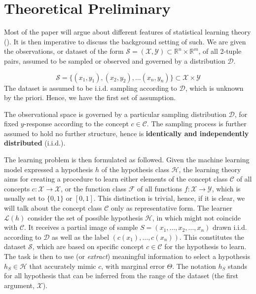 \documentclass{article}
\begin{document}
\section{Theoretical Preliminary}

Most of the paper will argue about different features of statistical learning theory (\cite{Sterkenburg_2024,Vapnik1999-VAPTNO,STL_Hajek_Maxim_2021}). It is then imperative to discuss the background setting of such. We are given the observations, or dataset of the form $\mathcal{S}=(\mathcal{X},\mathcal{Y})\subset \mathbb{R}^{n}\times \mathbb{R}^{m}$, of all 2-tuple pairs, assumed to be sampled or observed and governed by a distribution $\mathcal{D}$. 

\begin{equation*}
    \mathcal{S} = \{ (x_1,y_1), (x_2, y_2),\dots(x_n,y_n) \} \subset \mathcal{X}\times \mathcal{Y}
\end{equation*}
The dataset is assumed to be i.i.d. sampling according to $\mathcal{D}$, which is unknown by the priori. Hence, we have the first set of assumption. 
\begin{assumption}
The observational space is governed by a particular sampling distribution $\mathcal{D}$, for fixed $y$-response according to the concept $c\in \mathcal{C}$. The sampling process is further assumed to hold no further structure, hence is \textbf{identically and independently distributed} (i.i.d.). 
\end{assumption}
\vspace{2mm}

The learning problem is then formulated as followed. Given the machine learning model expressed a hypothesis $h$ of the hypothesis class $\mathcal{H}$, the learning theory aims for creating a procedure to learn either elements of the concept class $\mathcal{C}$ of all concepts $c: \mathcal{X}\to \mathcal{X}$, or the function class $\mathcal{F}$ of all functions $f: \mathcal{X}\to \mathcal{Y}$, which is usually set to $\{0,1\}$ or $[0,1]$. This distinction is trivial, hence, if it is clear, we will talk about the concept class $\mathcal{C}$ only as representative form. The learner $\mathcal{L}(h)$ consider the set of possible hypothesis $\mathcal{H}$, in which might not coincide with $\mathcal{C}$. It receives a partial image of sample $S=(x_{1},\dots,x_{2},\dots,x_n)$ drawn i.i.d. according to $\mathcal{D}$ as well as the label $(c(x_1),\dots,c(x_n))$. This constitutes the dataset $\mathcal{S}$, which are based on specific concept $c\in \mathcal{C}$ for the hypothesis to learn. The task is then to use (or \textit{extract}) meaningful information to select a hypothesis $h_{S}\in \mathcal{H}$ that accurately mimic $c$, with marginal error $\Theta$. The notation $h_{S}$ stands for all hypothesis that can be inferred from the range of the dataset (the first argument, $\mathcal{X}$). 
\end{document}
